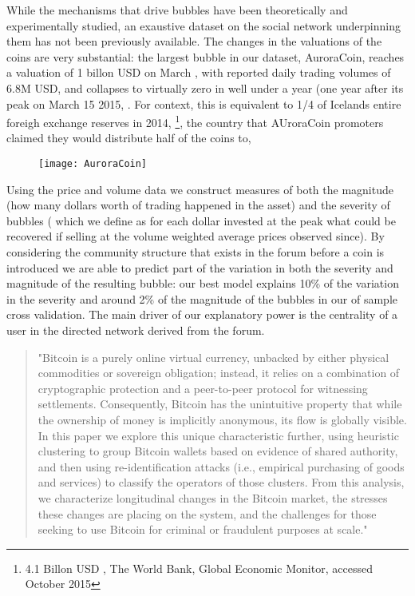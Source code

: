 While the mechanisms that drive bubbles have been theoretically  \cite{abolafia1988enacting, earl2007decision, bakker2010social, harras2011grow} and experimentally \cite{moinas2013bubble} studied, an exaustive dataset on the social network underpinning them has not been previously available.
The changes in the valuations of the coins are very substantial: the largest bubble in our dataset, AuroraCoin, reaches a valuation of 1 billon USD on March , with reported daily trading volumes of 6.8M USD, and collapses to virtually zero in well under a year (one year after its peak on March 15 2015, .
For context, this is equivalent to 1/4 of Icelands entire foreigh exchange reserves in 2014, \footnote{4.1 Billon USD , The World Bank, Global Economic Monitor, accessed October 2015}, the country that AUroraCoin promoters claimed they would distribute half of the coins to, 

\begin{figure}[b]
\texttt{[image: AuroraCoin]}
\end{figure}

Using the price and volume data we construct measures of both  the magnitude (how many dollars worth of trading happened in the asset) and the severity of bubbles ( which we define as for each dollar invested at the peak what could be recovered if selling at the volume weighted average prices observed since).
By considering the community structure that exists in the forum before a coin is introduced we are able to predict part of the variation in both the severity and magnitude of the resulting bubble: our best model explains 10\% of the variation in the severity and around 2\% of the magnitude of the bubbles in our of sample cross validation. 
The main driver of our explanatory power is the centrality of a user in the directed network derived from the forum.


\begin{quote}
"Bitcoin is a purely online virtual currency, unbacked by either physical commodities or sovereign obligation; instead, it relies on a combination of cryptographic protection and a peer-to-peer protocol for witnessing settlements. Consequently, Bitcoin has the unintuitive property that while the ownership of money is implicitly anonymous, its flow is globally visible. In this paper we explore this unique characteristic further, using heuristic clustering to group Bitcoin wallets based on evidence of shared authority, and then using re-identification attacks (i.e., empirical purchasing of goods and services) to classify the operators of those clusters. From this analysis, we characterize longitudinal changes in the Bitcoin market, the stresses these changes are placing on the system, and the challenges for those seeking to use Bitcoin for criminal or fraudulent purposes at scale." 
\end{quote} 
\cite{meiklejohn2013fistful}

